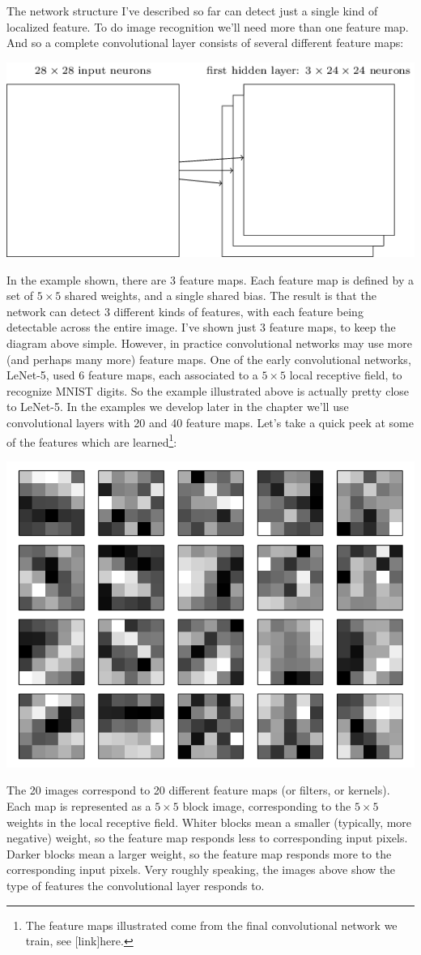 \documentclass[a4paper,twoside,10pt]{book}
\begin{document}
The network structure I've described so far can detect just a single kind of localized feature. To do image recognition we'll need more than one feature map. And so a complete convolutional layer consists of several different feature maps:
\begin{center}
	\includegraphics[height=0.3\linewidth]{figures/ch6/tikz46}
\end{center}
In the example shown, there are 3 feature maps. Each feature map is defined by a set of $5\times5$ shared weights, and a single shared bias. The result is that the network can detect 3 different kinds of features, with each feature being detectable across the entire image.
I've shown just 3 feature maps, to keep the diagram above simple. However, in practice convolutional networks may use more (and perhaps many more) feature maps. One of the early convolutional networks, LeNet-5, used 6 feature maps, each associated to a $5\times5$ local receptive field, to recognize MNIST digits. So the example illustrated above is actually pretty close to LeNet-5. In the examples we develop later in the chapter we'll use convolutional layers with 20 and 40 feature maps. Let's take a quick peek at some of the features which are learned\footnote{The feature maps illustrated come from the final convolutional network we train, see [link]here.}:
\begin{center}
	\includegraphics[width=0.6\linewidth]{figures/ch6/net_full_layer_0}
\end{center}
The 20 images correspond to 20 different feature maps (or filters, or kernels). Each map is represented as a $5\times5$ block image, corresponding to the $5\times5$ weights in the local receptive field. Whiter blocks mean a smaller (typically, more negative) weight, so the feature map responds less to corresponding input pixels. Darker blocks mean a larger weight, so the feature map responds more to the corresponding input pixels. Very roughly speaking, the images above show the type of features the convolutional layer responds to.
\end{document}
